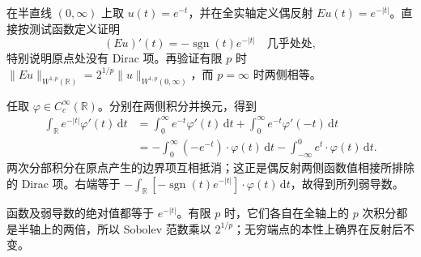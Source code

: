 \begin{exercise}\label{b1:ex:22-basic-even-reflection}
在半直线 \((0,\infty)\) 上取 \(u(t)=e^{-t}\)，并在全实轴定义偶反射
\(Eu(t)=e^{-|t|}\)。直接按测试函数定义证明
\[
 (Eu)'(t)=-\operatorname{sgn}(t)e^{-|t|}
 \quad\text{几乎处处},
\]
特别说明原点处没有 Dirac 项。再验证有限 \(p\) 时
\(\|Eu\|_{W^{1,p}(\mathbb R)}=2^{1/p}\|u\|_{W^{1,p}(0,\infty)}\)，而 \(p=\infty\) 时两侧相等。
\end{exercise}
\begin{solution}
任取 \(\varphi\in C_c^\infty(\mathbb R)\)。分别在两侧积分并换元，得到
\[
 \begin{aligned}
 \int_{\mathbb R}e^{-|t|}\varphi'(t)\,\mathrm dt
 &=\int_0^\infty e^{-t}\varphi'(t)\,\mathrm dt
   +\int_0^\infty e^{-t}\varphi'(-t)\,\mathrm dt\\
 &=-\int_0^\infty(-e^{-t})\cdot\varphi(t)\,\mathrm dt
   -\int_{-\infty}^0 e^t\cdot \varphi(t)\,\mathrm dt.
 \end{aligned}
\]
两次分部积分在原点产生的边界项互相抵消；这正是偶反射两侧函数值相接所排除的 Dirac 项。右端等于
\(-\int_{\mathbb R}[-\operatorname{sgn}(t)e^{-|t|}]\cdot \varphi(t)\,\mathrm dt\)，故得到所列弱导数。

函数及弱导数的绝对值都等于 \(e^{-|t|}\)。有限 \(p\) 时，它们各自在全轴上的 \(p\) 次积分都是半轴上的两倍，所以 Sobolev 范数乘以 \(2^{1/p}\)；无穷端点的本性上确界在反射后不变。
\end{solution}

